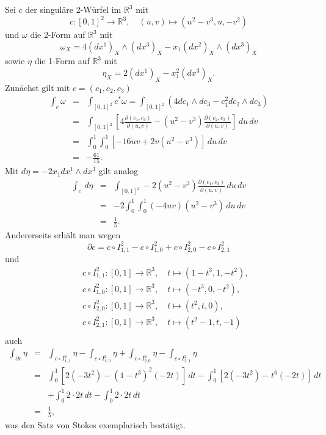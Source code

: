 \documentclass[a4paper,twoside,DIV15,BCOR12mm]{scrbook}
\begin{document}
\bigskip

 Sei $c$ der singuläre 2-Würfel im 
${\mathbb R}^{3}$ mit
\[ c: [0,1]^{2} \to {\mathbb R}^{3}, \quad (u,v) \mapsto (u^{2} - 
v^{3}, u, -v^{2}) \]
und $\omega$ die 2-Form auf ${\mathbb R}^{3}$ mit
\[ \omega_{X} = 4(dx^{1})_{X} \wedge (dx^{3})_{X} - 
x_{1}(dx^{2})_{X} \wedge (dx^{3})_{X} \]
sowie $\eta$ die 1-Form auf ${\mathbb R}^{3}$ mit
\[ \eta_{X} = 2(dx^{1})_{X} - x_{1}^{2}(dx^{3})_{X}. \]
Zunächst gilt mit $c = (c_{1},c_{2},c_{3})$
\begin{eqnarray*}
\int_{c} \omega & = & \int_{[0,1]^{2}} c^{*} \omega = 
\int_{[0,1]^{2}} (4dc_{1} \wedge dc_{3} - c_{1}^{2} dc_{2} \wedge 
dc_{3}) \\
& = & \int_{[0,1]^{2}} \left[4 \frac{\partial(c_{1},c_{3})}{\partial 
(u,v)} - (u^{2} - v^{3}) \frac{\partial(c_{2},c_{3})}{\partial(u,v)} 
\right] \, du\, dv \\
& = & \int_{0}^{1} \int_{0}^{1} [-16uv + 2v(u^{2} - v^{3})] \, du\, 
dv \\
& = & -\frac{61}{15}.
\end{eqnarray*}
Mit $d \eta = -2x_{1} dx^{1} \wedge dx^{3}$ gilt analog
\begin{eqnarray*}
\int_{c} \, d\eta & = & \int_{[0,1]^{2}} - 2(u^{2} - v^{3}) 
\frac{\partial(c_{1},c_{3})}{\partial (u,v)} \, du\, dv \\
& = & -2 \int_{0}^{1} \int_{0}^{1} (-4uv)(u^{2} - v^{3})\, du\, dv \\
& = & \frac{1}{5}.
\end{eqnarray*}
Andererseits erhält man wegen
\[ \partial c = c \circ I_{1,1}^{2} - c \circ I_{1,0}^{2} + c \circ 
I_{2,0}^{2} - c \circ I_{2,1}^{2} \]
und
\begin{eqnarray*}
&   & c \circ I_{1,1}^{2} : [0,1] \to {\mathbb R}^{3}, \quad t 
\mapsto (1-t^{3}, 1, -t^{2}), \\
&   & c \circ I_{1,0}^{2} : [0,1] \to {\mathbb R}^{3}, \quad t 
\mapsto (-t^{3},0, -t^{2}), \\
&   & c \circ I_{2,0}^{2} : [0,1] \to {\mathbb R}^{3}, \quad t 
\mapsto (t^{2}, t,0), \\
&   & c \circ I_{2,1}^{2} : [0,1] \to {\mathbb R}^{3}, \quad t 
\mapsto (t^{2} - 1,t,-1) \\
\end{eqnarray*}
auch
\begin{eqnarray*}
\int_{\partial c} \eta & = & \int_{c \circ I_{1,1}^{2}} \eta - 
\int_{c \circ I_{1,0}^{2}} \eta + \int_{c \circ I_{2,0}^{2}} \eta - 
\int_{c \circ I_{2,1}^{2}} \eta \\
& = & \int_{0}^{1} [2(-3t^{2}) - (1-t^{3})^{2}(-2t)] \, dt 
 - \int_{0}^{1} [2(-3t^{2}) - t^{6}(-2t)] \, dt \\
&   & + \int_{0}^{1} 2 \cdot 2t\, dt - \int_{0}^{1} 2 \cdot 2t\, dt \\
& = & \frac{1}{5},
\end{eqnarray*}
was den Satz von Stokes exemplarisch bestätigt.
\end{document}
